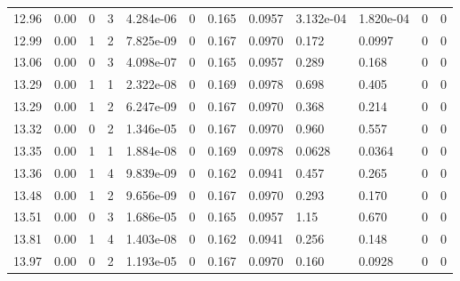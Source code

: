 \documentclass[preview]{standalone}
\begin{document}
{{{\begin{tabular}{L{1.2cm}C{1.2cm} C{0.3cm}C{0.5cm} C{1.4cm}C{1.4cm} C{1.4cm}C{1.4cm} C{1.6cm}C{1.6cm} C{1.6cm}C{1.6cm}}
  12.96  &  0.00  & 0     &  3 &  4.284e-06  & 0  &  0.165&   0.0957& 3.132e-04 & 1.820e-04   &  0 & 0  \\ 
  12.99  &  0.00  & 1     &  2 &  7.825e-09  & 0  &  0.167&   0.0970& 0.172 & 0.0997   &  0 & 0  \\ 
  13.06  &  0.00  & 0     &  3 &  4.098e-07  & 0  &  0.165&   0.0957& 0.289 & 0.168   &  0 & 0  \\ 
  13.29  &  0.00  & 1     &  1 &  2.322e-08  & 0  &  0.169&   0.0978& 0.698 & 0.405   &  0 & 0  \\ 
  13.29  &  0.00  & 1     &  2 &  6.247e-09  & 0  &  0.167&   0.0970& 0.368 & 0.214   &  0 & 0  \\ 
  13.32  &  0.00  & 0     &  2 &  1.346e-05  & 0  &  0.167&   0.0970& 0.960 & 0.557   &  0 & 0  \\ 
  13.35  &  0.00  & 1     &  1 &  1.884e-08  & 0  &  0.169&   0.0978& 0.0628 & 0.0364   &  0 & 0  \\ 
  13.36  &  0.00  & 1     &  4 &  9.839e-09  & 0  &  0.162&   0.0941& 0.457 & 0.265   &  0 & 0  \\ 
  13.48  &  0.00  & 1     &  2 &  9.656e-09  & 0  &  0.167&   0.0970& 0.293 & 0.170   &  0 & 0  \\ 
  13.51  &  0.00  & 0     &  3 &  1.686e-05  & 0  &  0.165&   0.0957& 1.15 & 0.670   &  0 & 0  \\ 
  13.81  &  0.00  & 1     &  4 &  1.403e-08  & 0  &  0.162&   0.0941& 0.256 & 0.148   &  0 & 0  \\ 
  13.97  &  0.00  & 0     &  2 &  1.193e-05  & 0  &  0.167&   0.0970& 0.160 & 0.0928   &  0 & 0  \\ 
\hline 
\end{tabular} 

}}}
\end{document}
